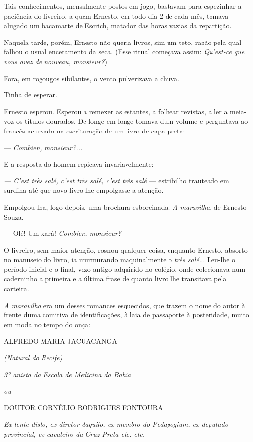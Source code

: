 Tais conhecimentos, mensalmente postos em jogo, bastavam para espezinhar
a paciência do livreiro, a quem Ernesto, em todo dia 2 de cada mês,
tomava alugado um bacamarte de Escrich, matador das horas vazias da
repartição.

Naquela tarde, porém, Ernesto não queria livros, sim um teto, razão pela
qual falhou o usual encetamento da seca. (Esse ritual começava assim:
\emph{Qu'est-ce que vous avez de nouveau, monsieur?})

Fora, em rogougos sibilantes, o vento pulverizava a chuva.

Tinha de esperar.

Ernesto esperou. Esperou a remexer as estantes, a folhear revistas, a
ler a meia-voz os títulos dourados. De longe em longe tomava dum volume
e perguntava ao francês acurvado na escrituração de um livro de capa
preta:

--- \emph{Combien, monsieur?...}

E a resposta do homem repicava invariavelmente:

\emph{--- C'est très salé, c'est très salé, c'est très salé} ---
estribilho trauteado em surdina até que novo livro lhe empolgasse a
atenção.

Empolgou-lha, logo depois, uma brochura esborcinada: \emph{A maravilha},
de Ernesto Souza.

--- Olé! Um xará! \emph{Combien, monsieur?}

O livreiro, sem maior atenção, rosnou qualquer coisa, enquanto Ernesto,
absorto no manuseio do livro, ia murmurando maquinalmente o \emph{très
salé}... Leu-lhe o período inicial e o final, vezo antigo adquirido no
colégio, onde colecionava num caderninho a primeira e a última frase de
quanto livro lhe transitava pela carteira.

\emph{A maravilha} era um desses romances esquecidos, que trazem o nome
do autor à frente duma comitiva de identificações, à laia de passaporte
à posteridade, muito em moda no tempo do onça:

ALFREDO MARIA JACUACANGA

\emph{(Natural do Recife)}

\emph{3º anista da Escola de Medicina da Bahia}

\emph{ou}

DOUTOR CORNÉLIO RODRIGUES FONTOURA

\emph{Ex-lente disto, ex-diretor daquilo, ex-membro do Pedagogium,
ex-deputado provincial, ex-cavaleiro da Cruz Preta etc. etc.}

